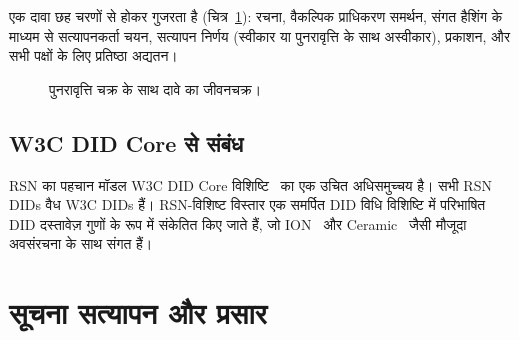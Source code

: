 \documentclass[11pt,a4paper,twocolumn]{article}
\begin{document}
एक दावा छह चरणों से होकर गुजरता है (चित्र~\ref{fig:lifecycle}): रचना, वैकल्पिक प्राधिकरण समर्थन, संगत हैशिंग के माध्यम से सत्यापनकर्ता चयन, सत्यापन निर्णय (स्वीकार या पुनरावृत्ति के साथ अस्वीकार), प्रकाशन, और सभी पक्षों के लिए प्रतिष्ठा अद्यतन।

\begin{figure}[ht]
\centering
{}
\caption{पुनरावृत्ति चक्र के साथ दावे का जीवनचक्र।}
\label{fig:lifecycle}
\end{figure}

\subsection{W3C DID Core से संबंध}

RSN का पहचान मॉडल W3C DID Core विशिष्टि~\cite{did2022} का एक उचित अधिसमुच्चय है। सभी RSN DIDs वैध W3C DIDs हैं। RSN-विशिष्ट विस्तार एक समर्पित DID विधि विशिष्टि में परिभाषित DID दस्तावेज़ गुणों के रूप में संकेतित किए जाते हैं, जो ION~\cite{buchner2021} और Ceramic~\cite{ceramic2023} जैसी मौजूदा अवसंरचना के साथ संगत हैं।

\section{सूचना सत्यापन और प्रसार}
\end{document}
